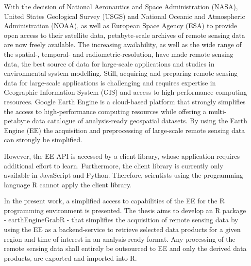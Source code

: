 
With the decision of National Aeronautics and Space Administration (NASA), United States Geological Survey (USGS) and National Oceanic and Atmospheric Administration (NOAA), as well as European Space Agency (ESA) to provide open access to their satellite data, petabyte-scale archives of remote sensing data are now freely available.
The increasing availability, as well as the wide range of the spatial-, temporal-  and radiometric-resolution, have made remote sensing data, the best source of data for large-scale applications and studies in environmental system modelling.
Still, acquiring and preparing remote sensing data for large-scale applications is challenging and requires expertise in Geographic Information System (GIS) and access to high-performance computing resources.
Google Earth Engine is a cloud-based platform that strongly simplifies the access to high-performance computing resources while offering a multi-petabyte data catalogue of analysis-ready geospatial datasets.
By using the Earth Engine (EE) the acquisition and preprocessing of large-scale remote sensing data can strongly be simplified.

However, the EE API is accessed by a client library, whose application requires additional effort to learn. Furthermore, the client library is currently only available in JavaScript and Python. Therefore, scientists using the programming language R cannot apply the client library.

In the present work, a simplified access to capabilities of the EE for the R programming environment is presented.
The thesis aims to develop an R package - earthEngineGrabR - that simplifies the acquisition of remote sensing data by using the EE as a backend-service to retrieve selected data products for a given region and time of interest in an analysis-ready format. Any processing of the remote sensing data shall entirely be outsourced to EE and only the derived data products, are exported and imported into R. 
